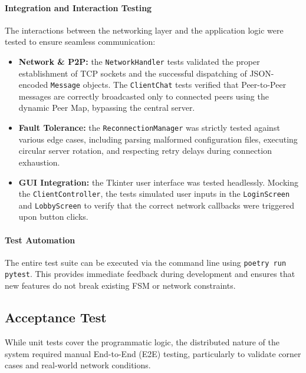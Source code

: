 \documentclass{scrartcl}
\begin{document}
\paragraph{Integration and Interaction Testing}

The interactions between the networking layer and the application logic were tested to ensure seamless communication:
\begin{itemize}
    \item \textbf{Network \& P2P:} the \texttt{NetworkHandler} tests validated the proper establishment of TCP sockets 
    and the successful dispatching of JSON-encoded \texttt{Message} objects. 
    The \texttt{ClientChat} tests verified that Peer-to-Peer messages are correctly broadcasted only to connected peers using the dynamic Peer Map, 
    bypassing the central server.
    \item \textbf{Fault Tolerance:} the \texttt{ReconnectionManager} was strictly tested against various edge cases, including parsing malformed configuration files, 
    executing circular server rotation, and respecting retry delays during connection exhaustion.
    \item \textbf{GUI Integration:} the Tkinter user interface was tested headlessly. 
    Mocking the \texttt{ClientController}, the tests simulated user inputs in the \texttt{LoginScreen} and \texttt{LobbyScreen} to verify that the correct network 
    callbacks were triggered upon button clicks.
\end{itemize}

\paragraph{Test Automation}
The entire test suite can be executed via the command line using \texttt{poetry run pytest}. 
This provides immediate feedback during development and ensures that new features do not break existing FSM or network constraints.

\subsection{Acceptance Test}\label{acceptance-test}

While unit tests cover the programmatic logic, the distributed nature of the system required manual End-to-End (E2E) testing, 
particularly to validate corner cases and real-world network conditions.
\end{document}
